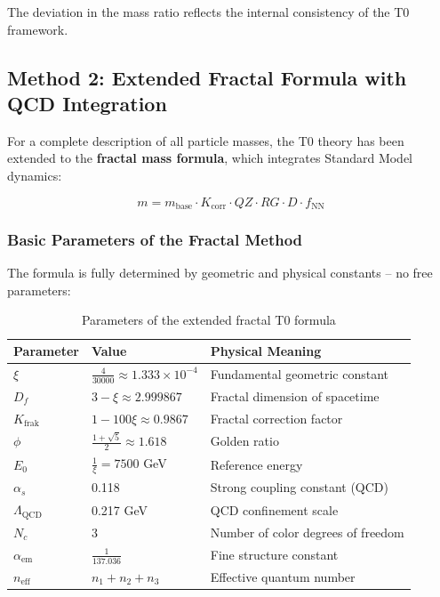 	The deviation in the mass ratio reflects the internal consistency of the T0 framework.

	\subsection{Method 2: Extended Fractal Formula with QCD Integration}
	
	For a complete description of all particle masses, the T0 theory has been extended to the \textbf{fractal mass formula}, which integrates Standard Model dynamics:
	
	\begin{equation}
		\boxed{m = m_{\text{base}} \cdot K_{\text{corr}} \cdot QZ \cdot RG \cdot D \cdot f_{\text{NN}}}
		\label{eq:t0_fractal_mass}
	\end{equation}
	
	\subsubsection{Basic Parameters of the Fractal Method}
	
	The formula is fully determined by geometric and physical constants -- no free parameters:
	
	\begin{table}[h]
		\centering
		\small
		\begin{tabular}{lll}
			\toprule
			\textbf{Parameter} & \textbf{Value} & \textbf{Physical Meaning} \\
			\midrule
			$\xi$ & $\frac{4}{30000} \approx 1.333 \times 10^{-4}$ & Fundamental geometric constant \\
			$D_f$ & $3 - \xi \approx 2.999867$ & Fractal dimension of spacetime \\
			$K_{\text{frak}}$ & $1 - 100\xi \approx 0.9867$ & Fractal correction factor \\
			$\phi$ & $\frac{1 + \sqrt{5}}{2} \approx 1.618$ & Golden ratio \\
			$E_0$ & $\frac{1}{\xi} = 7500$ GeV & Reference energy \\
			$\alpha_s$ & 0.118 & Strong coupling constant (QCD) \\
			$\Lambda_{\text{QCD}}$ & 0.217 GeV & QCD confinement scale \\
			$N_c$ & 3 & Number of color degrees of freedom \\
			$\alpha_{\text{em}}$ & $\frac{1}{137.036}$ & Fine structure constant \\
			$n_{\text{eff}}$ & $n_1 + n_2 + n_3$ & Effective quantum number \\
			\bottomrule
		\end{tabular}
		\caption{Parameters of the extended fractal T0 formula}
		\label{tab:fractal_params}
	\end{table}
	
